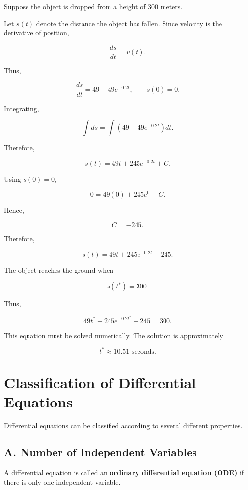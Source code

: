 \documentclass[11pt]{article}
\begin{document}
Suppose the object is dropped from a height of $300$ meters.

Let $s(t)$ denote the distance the object has fallen. Since velocity is
the derivative of position,

\[
\frac{ds}{dt}=v(t).
\]

Thus,

\[
\frac{ds}{dt}
=
49-49e^{-0.2t},
\qquad
s(0)=0.
\]

Integrating,

\[
\int ds
=
\int
\left(
49-49e^{-0.2t}
\right)dt.
\]

Therefore,

\[
s(t)
=
49t+245e^{-0.2t}+C.
\]

Using $s(0)=0$,

\[
0
=
49(0)+245e^0+C.
\]

Hence,

\[
C=-245.
\]

Therefore,

\[
\boxed{
s(t)=49t+245e^{-0.2t}-245
}.
\]

The object reaches the ground when

\[
s(t^*)=300.
\]

Thus,

\[
49t^*
+
245e^{-0.2t^*}
-
245
=
300.
\]

This equation must be solved numerically. The solution is approximately

\[
\boxed{
t^*\approx10.51\text{ seconds}.
}
\]

\section{Classification of Differential Equations}

Differential equations can be classified according to several
different properties.

\subsection{A. Number of Independent Variables}

A differential equation is called an \textbf{ordinary differential
equation (ODE)} if there is only one independent variable.
\end{document}
